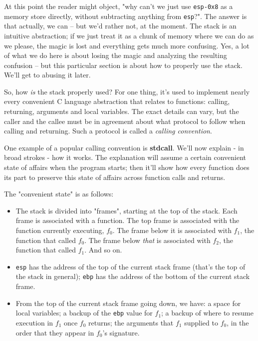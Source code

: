 \documentclass{article}
\newcommand{\xcode}[2]{\colorbox{ubuntuback}{\lstinline[language=#1]|#2|}}
\newcommand{\asm}[1]{\xcode{{[x86masm]assembler}}{#1}}
\begin{document}
At this point the reader might object, "why can't we just use \asm{esp-0x8} as a memory store directly, without subtracting anything from \asm{esp}?". The answer is that actually, we can -- but we'd rather not, at the moment. The stack is an intuitive abstraction; if we just treat it as a chunk of memory where we can do as we please, the magic is lost and everything gets much more confusing. Yes, a lot of what we do here is about losing the magic and analyzing the resulting confusion -- but this particular section is about how to properly use the stack. We'll get to abusing it later.

So, how \textit{is} the stack properly used? For one thing, it's used to implement nearly every convenient C language abstraction that relates to functions: calling, returning, arguments and local variables. The exact details can vary, but the caller and the callee must be in agreement about what protocol to follow when calling and returning. Such a protocol is called a \textit{calling convention}. 

One example of a popular calling convention is \textbf{stdcall}. We'll now explain - in broad strokes - how it works. The explanation will assume a certain convenient state of affairs when the program starts; then it'll show how every function does its part to preserve this state of affairs across function calls and returns.

The "convenient state" is as follows: 
\begin{itemize}
    \item The stack is divided into "frames", starting at the top of the stack. Each frame is associated with a function. The top frame is associated with the function currently executing, $f_0$. The frame below it is associated with $f_1$, the function that called $f_0$. The frame below \textit{that} is associated with $f_2$, the function that called $f_1$. And so on.
    \item \asm{esp} has the address of the top of the current stack frame (that's the top of the stack in general); \asm{ebp} has the address of the bottom of the current stack frame.
    \item From the top of the current stack frame going down, we have: a space for local variables; a backup of the \asm{ebp} value for $f_1$; a backup of where to resume execution in $f_1$ once $f_0$ returns; the arguments that $f_1$ supplied to $f_0$, in the order that they appear in $f_0$'s signature.
\end{itemize}
\end{document}
